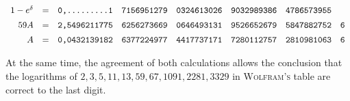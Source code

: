 \[\begin{array}{rcrlllll}
1-e^\delta&=&\text{\ttfamily 0,.........1}&\text{\ttfamily 7156951279}&\text{\ttfamily 0324613026}&\text{\ttfamily 9032989386}&\text{\ttfamily 4786573955}&\\[5pt]
59A&=&\text{\ttfamily 2,5496211775}&\text{\ttfamily 6256273669}&\text{\ttfamily 0646493131}&\text{\ttfamily 9526652679}&\text{\ttfamily 5847882752}&\text{\ttfamily 6}\\[5pt]
A&=&\text{\ttfamily 0,0432139182}&\text{\ttfamily 6377224977}&\text{\ttfamily 4417737171}&\text{\ttfamily 7280112757}&\text{\ttfamily 2810981063}&\text{\ttfamily 6}
\end{array}
\]\endgroup


At the same time, the agreement of both calculations allows the conclusion
that the logarithms of $2,3,5,11,13,59,67,1091,2281,3329$ in
\textsc{Wolfram's} table are correct to the last digit.

\clearpage
\endgroup
